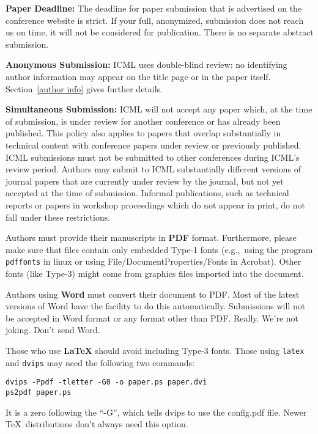 \documentclass{article}
\begin{document}
\textbf{Paper Deadline:} The deadline for paper submission that is
advertised on the conference website is strict. If your full,
anonymized, submission does not reach us on time, it will not be
considered for publication. There is no separate abstract submission.

\textbf{Anonymous Submission:} ICML uses double-blind review: no identifying
author information may appear on the title page or in the paper
itself. Section~\ref{author info} gives further details.

\textbf{Simultaneous Submission:} ICML will not accept any paper which,
at the time of submission, is under review for another conference or
has already been published. This policy also applies to papers that
overlap substantially in technical content with conference papers
under review or previously published. ICML submissions must not be
submitted to other conferences during ICML's review period. Authors
may submit to ICML substantially different versions of journal papers
that are currently under review by the journal, but not yet accepted
at the time of submission. Informal publications, such as technical
reports or papers in workshop proceedings which do not appear in
print, do not fall under these restrictions.

\medskip

Authors must provide their manuscripts in \textbf{PDF} format.
Furthermore, please make sure that files contain only embedded Type-1 fonts
(e.g.,~using the program \texttt{pdffonts} in linux or using
File/DocumentProperties/Fonts in Acrobat). Other fonts (like Type-3)
might come from graphics files imported into the document.

Authors using \textbf{Word} must convert their document to PDF\@. Most
of the latest versions of Word have the facility to do this
automatically. Submissions will not be accepted in Word format or any
format other than PDF\@. Really. We're not joking. Don't send Word.

Those who use \textbf{\LaTeX} should avoid including Type-3 fonts.
Those using \texttt{latex} and \texttt{dvips} may need the following
two commands:

{\footnotesize
\begin{verbatim}
dvips -Ppdf -tletter -G0 -o paper.ps paper.dvi
ps2pdf paper.ps
\end{verbatim}}
It is a zero following the ``-G'', which tells dvips to use
the config.pdf file. Newer \TeX\ distributions don't always need this
option.
\end{document}
